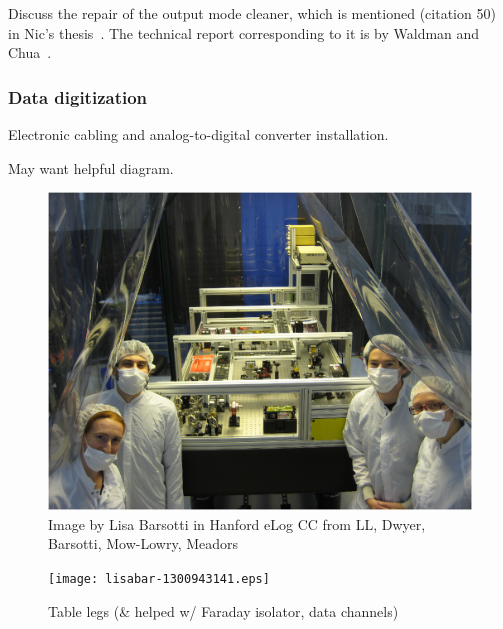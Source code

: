		Discuss the repair of the output mode cleaner, which is mentioned (citation 50) in Nic's thesis~\cite{SmithThesis}. The technical report corresponding to it is by Waldman and Chua~\cite{Waldman2011}.

            \subsubsection{Data digitization}
            \label{data_digitization}

                Electronic cabling and analog-to-digital converter installation.

		May want helpful diagram.






\begin{figure}
\begin{center}
\includegraphics[width=0.6\paperwidth]{lisabar-1289966130.eps}




\caption{Image by Lisa Barsotti in Hanford eLog
\newline CC from LL, Dwyer, Barsotti, Mow-Lowry, Meadors
}
\end{center}
\end{figure}
\begin{figure}
\begin{center}
\texttt{[image: lisabar-1300943141.eps]}
\caption{Table legs (\& helped w/ Faraday isolator, data channels)
}
\end{center}
\end{figure}


